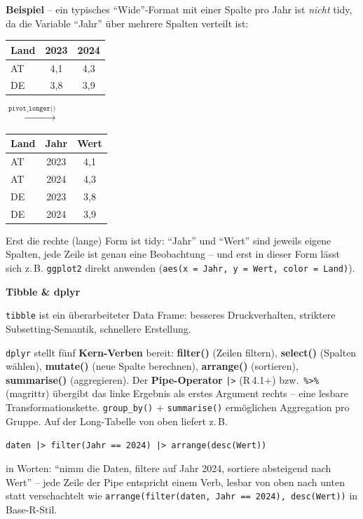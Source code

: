 \textbf{Beispiel} -- ein typisches ``Wide''-Format mit einer Spalte pro Jahr ist \emph{nicht} tidy, da die Variable ``Jahr'' über mehrere Spalten verteilt ist:
\begin{center}
\small
\begin{tabular}{lcc} \toprule
Land & 2023 & 2024 \\ \midrule
AT & 4{,}1 & 4{,}3 \\
DE & 3{,}8 & 3{,}9 \\ \bottomrule
\end{tabular}
\quad
$\xrightarrow{\texttt{pivot\_longer()}}$
\quad
\begin{tabular}{lcc} \toprule
Land & Jahr & Wert \\ \midrule
AT & 2023 & 4{,}1 \\
AT & 2024 & 4{,}3 \\
DE & 2023 & 3{,}8 \\
DE & 2024 & 3{,}9 \\ \bottomrule
\end{tabular}
\end{center}
Erst die rechte (lange) Form ist tidy: ``Jahr'' und ``Wert'' sind jeweils eigene Spalten, jede Zeile ist genau eine Beobachtung -- und erst in dieser Form lässt sich z.\,B. \texttt{ggplot2} direkt anwenden (\texttt{aes(x = Jahr, y = Wert, color = Land)}).

\textbf{Tibble \& dplyr}

\texttt{tibble} ist ein überarbeiteter Data Frame: besseres Druckverhalten, striktere Subsetting-Semantik, schnellere Erstellung.

\texttt{dplyr} stellt fünf \textbf{Kern-Verben} bereit: \textbf{filter()} (Zeilen filtern), \textbf{select()} (Spalten wählen), \textbf{mutate()} (neue Spalte berechnen), \textbf{arrange()} (sortieren), \textbf{summarise()} (aggregieren). Der \textbf{Pipe-Operator} \texttt{|>} (R\,4.1+) bzw.\ \texttt{\%>\%} (magrittr) übergibt das linke Ergebnis als erstes Argument rechts -- eine lesbare Transformationskette. \texttt{group\_by()} + \texttt{summarise()} ermöglichen Aggregation pro Gruppe. Auf der Long-Tabelle von oben liefert z.\,B.
\begin{center}
\texttt{daten |> filter(Jahr == 2024) |> arrange(desc(Wert))}
\end{center}
in Worten: ``nimm die Daten, filtere auf Jahr 2024, sortiere absteigend nach Wert'' -- jede Zeile der Pipe entspricht einem Verb, lesbar von oben nach unten statt verschachtelt wie \texttt{arrange(filter\allowbreak (daten, Jahr == 2024), desc(Wert))} in Base-R-Stil.

